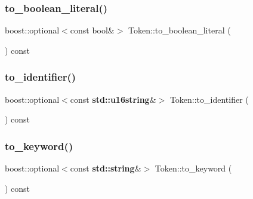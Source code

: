 \mbox{\label{class_token_a6b583ee8d826950108c7e65b18aca33b}} 
\subsubsection{\texorpdfstring{to\+\_\+boolean\+\_\+literal()}{to\_boolean\_literal()}}
{\footnotesize\ttfamily boost\+::optional$<$const bool\&$>$ Token\+::to\+\_\+boolean\+\_\+literal (\begin{DoxyParamCaption}{ }\end{DoxyParamCaption}) const}

\mbox{\label{class_token_ac17d83844f2b4bc36f20e2686d84e7a4}} 
\subsubsection{\texorpdfstring{to\+\_\+identifier()}{to\_identifier()}}
{\footnotesize\ttfamily boost\+::optional$<$const \textbf{ std\+::u16string}\&$>$ Token\+::to\+\_\+identifier (\begin{DoxyParamCaption}{ }\end{DoxyParamCaption}) const}

\mbox{\label{class_token_a4e83b79ea7bbfad2ff31bb0854f602d4}} 
\subsubsection{\texorpdfstring{to\+\_\+keyword()}{to\_keyword()}}
{\footnotesize\ttfamily boost\+::optional$<$const \textbf{ std\+::string}\&$>$ Token\+::to\+\_\+keyword (\begin{DoxyParamCaption}{ }\end{DoxyParamCaption}) const}

\mbox{\label{class_token_ab0d3c8f7d81bf3047ab6554f37d81c39}} 
